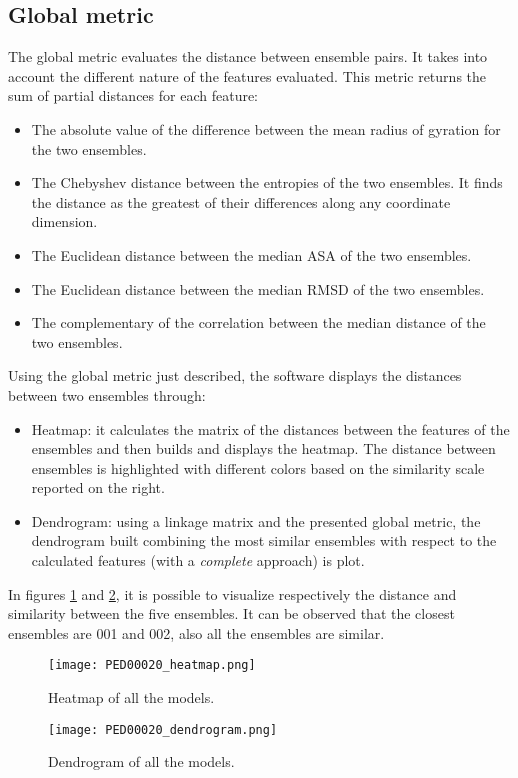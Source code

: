 \subsection{Global metric}
The global metric evaluates the distance between ensemble pairs. It takes into account the different nature of the features evaluated.
This metric returns the sum of partial distances for each feature:
\begin{itemize}
\item The absolute value of the difference between the mean radius of gyration for the two ensembles.
\item The Chebyshev distance between the entropies of the two ensembles. It finds the distance as the greatest of their differences along any coordinate dimension.
\item The Euclidean distance between the median ASA of the two ensembles.
\item The Euclidean distance between the median RMSD of the two ensembles.
\item The complementary of the correlation between the median distance of the two ensembles.
\end{itemize}


Using the global metric just described, the software displays the distances between two ensembles through:
\begin{itemize}
\item Heatmap: it calculates the matrix of the distances between the features of the ensembles and then builds and displays the heatmap. The distance between ensembles is highlighted with different colors based on the similarity scale reported on the right. 
\item Dendrogram: using a linkage matrix and the presented global metric, the dendrogram built combining the most similar ensembles with respect to the calculated features (with a \emph{complete} approach) is plot.
\end{itemize}

In figures \ref{heatmap} and \ref{dendrogram}, it is possible to visualize respectively the distance and similarity between the five ensembles. It can be observed that the closest ensembles are 001 and 002, also all the ensembles are similar.

\begin{figure}[H]
	\begin{minipage}[b]{0.93\textwidth}
		\centering
		\texttt{[image: PED00020\_heatmap.png]}
		\caption{Heatmap of all the models.}
		\label{heatmap}
	\end{minipage}
\end{figure}
\begin{figure}[H]
	\begin{minipage}[b]{0.93\textwidth}
		\centering
		\texttt{[image: PED00020\_dendrogram.png]}
		\caption{Dendrogram of all the models.}
		\label{dendrogram}
	\end{minipage}
\end{figure}


